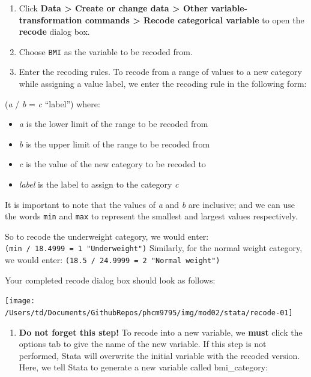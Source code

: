 \documentclass[
]{memoir}
\providecommand{\tightlist}{%
  \setlength{\itemsep}{0pt}\setlength{\parskip}{0pt}}
\begin{document}
\begin{enumerate}
\def\labelenumi{\arabic{enumi})}
\tightlist
\item
  Click \textbf{Data \textgreater{} Create or change data \textgreater{} Other variable-transformation commands \textgreater{} Recode categorical variable} to open the \textbf{recode} dialog box.
\item
  Choose \texttt{BMI} as the variable to be recoded from.
\item
  Enter the recoding rules. To recode from a range of values to a new category while assigning a value label, we enter the recoding rule in the following form:
\end{enumerate}

(\emph{a} / \emph{b} = \emph{c} ``label'') where:

\begin{itemize}
\tightlist
\item
  \emph{a} is the lower limit of the range to be recoded from
\item
  \emph{b} is the upper limit of the range to be recoded from
\item
  \emph{c} is the value of the new category to be recoded to
\item
  \emph{label} is the label to assign to the category \emph{c}
\end{itemize}

It is important to note that the values of \emph{a} and \emph{b} are inclusive; and we can use the words \texttt{min} and \texttt{max} to represent the smallest and largest values respectively.

So to recode the underweight category, we would enter: \texttt{(min\ /\ 18.4999\ =\ 1\ "Underweight")}
Similarly, for the normal weight category, we would enter: \texttt{(18.5\ /\ 24.9999\ =\ 2\ "Normal\ weight")}

Your completed recode dialog box should look as follows:

\texttt{[image: /Users/td/Documents/GithubRepos/phcm9795/img/mod02/stata/recode-01]}

\begin{enumerate}
\def\labelenumi{\arabic{enumi})}
\setcounter{enumi}{3}
\tightlist
\item
  \textbf{Do not forget this step!} To recode into a new variable, we \textbf{must} click the options tab to give the name of the new variable. If this step is not performed, Stata will overwrite the initial variable with the recoded version. Here, we tell Stata to generate a new variable called bmi\_category:
\end{enumerate}
\end{document}
